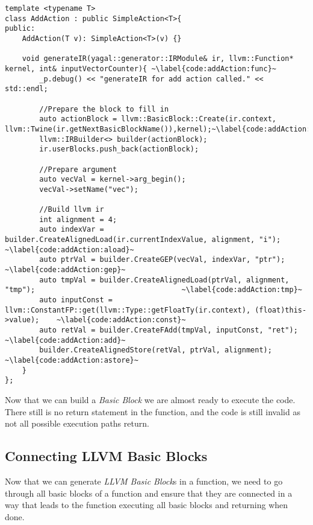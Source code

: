 \begin{lstlisting}[caption={The AddAction class.}, label={code:addAction}]
template <typename T>
class AddAction : public SimpleAction<T>{
public:
    AddAction(T v): SimpleAction<T>(v) {}

    void generateIR(yagal::generator::IRModule& ir, llvm::Function* kernel, int& inputVectorCounter){ ~\label{code:addAction:func}~
        _p.debug() << "generateIR for add action called." << std::endl;

        //Prepare the block to fill in
        auto actionBlock = llvm::BasicBlock::Create(ir.context, llvm::Twine(ir.getNextBasicBlockName()),kernel);~\label{code:addAction:bbc}~
        llvm::IRBuilder<> builder(actionBlock);
        ir.userBlocks.push_back(actionBlock);

        //Prepare argument
        auto vecVal = kernel->arg_begin();
        vecVal->setName("vec");

        //Build llvm ir
        int alignment = 4;
        auto indexVar = builder.CreateAlignedLoad(ir.currentIndexValue, alignment, "i");                    ~\label{code:addAction:aload}~
        auto ptrVal = builder.CreateGEP(vecVal, indexVar, "ptr");                                           ~\label{code:addAction:gep}~
        auto tmpVal = builder.CreateAlignedLoad(ptrVal, alignment, "tmp");                                  ~\label{code:addAction:tmp}~
        auto inputConst = llvm::ConstantFP::get(llvm::Type::getFloatTy(ir.context), (float)this->value);    ~\label{code:addAction:const}~
        auto retVal = builder.CreateFAdd(tmpVal, inputConst, "ret");                                        ~\label{code:addAction:add}~
        builder.CreateAlignedStore(retVal, ptrVal, alignment);                                              ~\label{code:addAction:astore}~
    }
};
\end{lstlisting}

Now that we can build a \textit{Basic Block} we are almost ready to execute the code. There still is no return statement in the function, and the code is still invalid as not all possible execution paths return.

\subsection{Connecting LLVM Basic Blocks} \label{sec:bblinking}
Now that we can generate \textit{LLVM Basic Block}s in a function, we need to go through all basic blocks of a function and ensure that they are connected in a way that leads to the function executing all basic blocks and returning when done.

